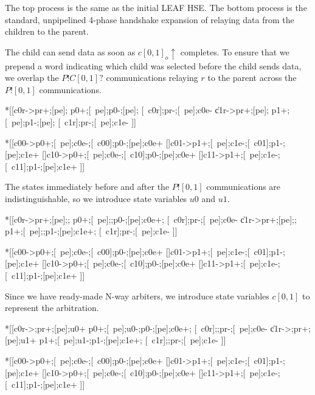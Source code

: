 \documentclass{article}
\begin{document}
\noindent
The top process is the same as the initial LEAF HSE. The bottom process is the 
standard, unpipelined 4-phase handshake expansion of relaying data from the 
children to the parent.

\noindent
The child can send data as soon as $c[0,1]_o\!\uparrow$ completes.
To ensure that we prepend a word indicating which child was selected before
the child sends data, we overlap the $P!C[0,1]?$ communications relaying
$r$ to the parent across the $P![0,1]$ communications.

\begin{hse}
*[[c0r->pr+;[pe];
    p0+;[~pe];p0-;[pe];
    [~c0r];pr-;[~pe];c0e-
  \|c1r->pr+;[pe];
    p1+;[~pe];p1-;[pe];
    [~c1r];pr-;[~pe];c1e-
 ]]
\end{hse}

\begin{hse}
*[[c00->p0+;[~pe];c0e-;[~c00];p0-;[pe];c0e+
  []c01->p1+;[~pe];c1e-;[~c01];p1-;[pe];c1e+
  []c10->p0+;[~pe];c0e-;[~c10];p0-;[pe];c0e+
  []c11->p1+;[~pe];c1e-;[~c11];p1-;[pe];c1e+
 ]]
\end{hse}

\noindent
The states immediately before and after the $P![0,1]$ communications are
indistinguishable, so we introduce state variables $u0$ and $u1$.

\begin{hse}
*[[c0r->pr+;[pe];;
    p0+;[~pe];;p0-;[pe];c0e+;
    [~c0r];pr-;[~pe];c0e-
  \|c1r->pr+;[pe];;
    p1+;[~pe];;p1-;[pe];c1e+;
    [~c1r];pr-;[~pe];c1e-
 ]]
\end{hse}

\begin{hse}
*[[c00->p0+;[~pe];c0e-;[~c00];p0-;[pe];c0e+
  []c01->p1+;[~pe];c1e-;[~c01];p1-;[pe];c1e+
  []c10->p0+;[~pe];c0e-;[~c10];p0-;[pe];c0e+
  []c11->p1+;[~pe];c1e-;[~c11];p1-;[pe];c1e+
 ]]
\end{hse}

\noindent
Since we have ready-made N-way arbiters, we introduce state variables $c[0,1]$ 
to represent the arbitration.

\begin{hse}
*[[c0r->;pr+;[pe];u0+
    p0+;[~pe];u0-;p0-;[pe];c0e+;
    [~c0r];;pr-;[~pe];c0e-
  \|c1r->;pr+;[pe];u1+
    p1+;[~pe];u1-;p1-;[pe];c1e+;
    [~c1r];;pr-;[~pe];c1e-
 ]]
\end{hse}

\begin{hse}
*[[c00->p0+;[~pe];c0e-;[~c00];p0-;[pe];c0e+
  []c01->p1+;[~pe];c1e-;[~c01];p1-;[pe];c1e+
  []c10->p0+;[~pe];c0e-;[~c10];p0-;[pe];c0e+
  []c11->p1+;[~pe];c1e-;[~c11];p1-;[pe];c1e+
 ]]
\end{hse}
\end{document}
